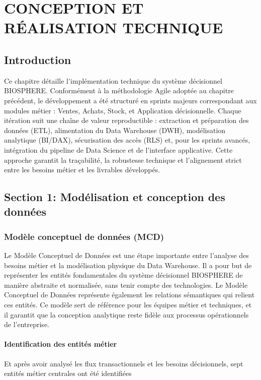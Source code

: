 \newpage

\pagestyle{fancy}
\renewcommand{\headrulewidth}{0.5pt}
\renewcommand{\footrulewidth}{0.5pt}

\chapter{CONCEPTION ET RÉALISATION TECHNIQUE}\setlength{\headheight}{28pt}
\label{ch3}
\minitoc

\newpage

\section{Introduction}
Ce chapitre détaille l'implémentation technique du système décisionnel BIOSPHERE. Conformément à la méthodologie Agile adoptée au chapitre précédent, le développement a été structuré en sprints majeurs correspondant aux modules métier : Ventes, Achats, Stock, et Application décisionnelle. Chaque itération suit une chaîne de valeur reproductible : extraction et préparation des données (ETL), alimentation du Data Warehouse (DWH), modélisation analytique (BI/DAX), sécurisation des accès (RLS) et, pour les sprints avancés, intégration du pipeline de Data Science et de l'interface applicative. Cette approche garantit la traçabilité, la robustesse technique et l'alignement strict entre les besoins métier et les livrables développés.
\section{ Section 1: Modélisation et conception des données}
\subsection{Modèle conceptuel de données (MCD)}
Le Modèle Conceptuel de Données est une étape importante entre l'analyse des besoins métier et la modélisation physique du Data Warehouse. Il a pour but de représenter les entités fondamentales du système décisionnel BIOSPHERE de manière abstraite et normalisée, sans tenir compte des technologies. Le Modèle Conceptuel de Données représente également les relations sémantiques qui relient ces entités. Ce modèle sert de référence pour les équipes métier et techniques, et il garantit que la conception analytique reste fidèle aux processus opérationnels de l'entreprise.
\subsubsection{Identification des entités métier}
Et après avoir analysé les flux transactionnels et les besoins décisionnels, sept entités métier centrales ont été identifiées

